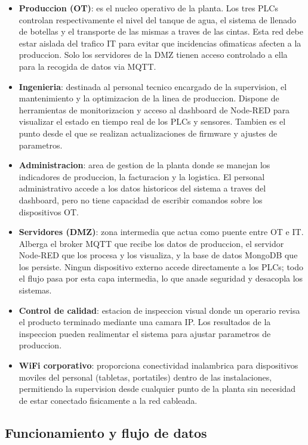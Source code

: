 \begin{itemize}
    \item \textbf{Produccion (OT)}: es el nucleo operativo de la planta. Los tres PLCs controlan respectivamente el nivel del tanque de agua, el sistema de llenado de botellas y el transporte de las mismas a traves de las cintas. Esta red debe estar aislada del trafico IT para evitar que incidencias ofimaticas afecten a la produccion. Solo los servidores de la DMZ tienen acceso controlado a ella para la recogida de datos via MQTT.
    \item \textbf{Ingenieria}: destinada al personal tecnico encargado de la supervision, el mantenimiento y la optimizacion de la linea de produccion. Dispone de herramientas de monitorizacion y acceso al dashboard de Node-RED para visualizar el estado en tiempo real de los PLCs y sensores. Tambien es el punto desde el que se realizan actualizaciones de firmware y ajustes de parametros.
    \item \textbf{Administracion}: area de gestion de la planta donde se manejan los indicadores de produccion, la facturacion y la logistica. El personal administrativo accede a los datos historicos del sistema a traves del dashboard, pero no tiene capacidad de escribir comandos sobre los dispositivos OT.
    \item \textbf{Servidores (DMZ)}: zona intermedia que actua como puente entre OT e IT. Alberga el broker MQTT que recibe los datos de produccion, el servidor Node-RED que los procesa y los visualiza, y la base de datos MongoDB que los persiste. Ningun dispositivo externo accede directamente a los PLCs; todo el flujo pasa por esta capa intermedia, lo que anade seguridad y desacopla los sistemas.
    \item \textbf{Control de calidad}: estacion de inspeccion visual donde un operario revisa el producto terminado mediante una camara IP. Los resultados de la inspeccion pueden realimentar el sistema para ajustar parametros de produccion.
    \item \textbf{WiFi corporativo}: proporciona conectividad inalambrica para dispositivos moviles del personal (tabletas, portatiles) dentro de las instalaciones, permitiendo la supervision desde cualquier punto de la planta sin necesidad de estar conectado fisicamente a la red cableada.
\end{itemize}

\subsection{Funcionamiento y flujo de datos}

